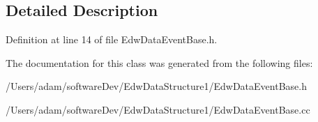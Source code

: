 \subsection{Detailed Description}


Definition at line 14 of file EdwDataEventBase.h.



The documentation for this class was generated from the following files:\begin{DoxyCompactItemize}
\item 
/Users/adam/softwareDev/EdwDataStructure1/EdwDataEventBase.h\item 
/Users/adam/softwareDev/EdwDataStructure1/EdwDataEventBase.cc\end{DoxyCompactItemize}
